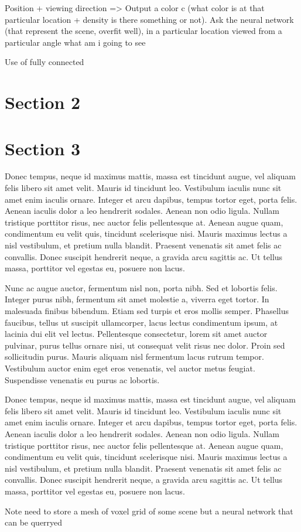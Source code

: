 \documentclass[twocolumn,superscriptaddress,aps]{revtex4-1}
\begin{document}
Position + viewing direction => Output a color c (what color is at that particular location + density is there something or not). Ask the neural network (that represent the scene, overfit well), in a particular location viewed from a particular angle what am i going to see


Use of fully connected
\section{Section 2}


\section{Section 3}

Donec tempus, neque id maximus mattis, massa est tincidunt augue, vel aliquam felis libero sit amet velit. Mauris id tincidunt leo. Vestibulum iaculis nunc sit amet enim iaculis ornare. Integer et arcu dapibus, tempus tortor eget, porta felis. Aenean iaculis dolor a leo hendrerit sodales. Aenean non odio ligula. Nullam tristique porttitor risus, nec auctor felis pellentesque at. Aenean augue quam, condimentum eu velit quis, tincidunt scelerisque nisi. Mauris maximus lectus a nisl vestibulum, et pretium nulla blandit. Praesent venenatis sit amet felis ac convallis. Donec suscipit hendrerit neque, a gravida arcu sagittis ac. Ut tellus massa, porttitor vel egestas eu, posuere non lacus.

Nunc ac augue auctor, fermentum nisl non, porta nibh. Sed et lobortis felis. Integer purus nibh, fermentum sit amet molestie a, viverra eget tortor. In malesuada finibus bibendum. Etiam sed turpis et eros mollis semper. Phasellus faucibus, tellus ut suscipit ullamcorper, lacus lectus condimentum ipsum, at lacinia dui elit vel lectus. Pellentesque consectetur, lorem sit amet auctor pulvinar, purus tellus ornare nisi, ut consequat velit risus nec dolor. Proin sed sollicitudin purus. Mauris aliquam nisl fermentum lacus rutrum tempor. Vestibulum auctor enim eget eros venenatis, vel auctor metus feugiat. Suspendisse venenatis eu purus ac lobortis.

Donec tempus, neque id maximus mattis, massa est tincidunt augue, vel aliquam felis libero sit amet velit. Mauris id tincidunt leo. Vestibulum iaculis nunc sit amet enim iaculis ornare. Integer et arcu dapibus, tempus tortor eget, porta felis. Aenean iaculis dolor a leo hendrerit sodales. Aenean non odio ligula. Nullam tristique porttitor risus, nec auctor felis pellentesque at. Aenean augue quam, condimentum eu velit quis, tincidunt scelerisque nisi. Mauris maximus lectus a nisl vestibulum, et pretium nulla blandit. Praesent venenatis sit amet felis ac convallis. Donec suscipit hendrerit neque, a gravida arcu sagittis ac. Ut tellus massa, porttitor vel egestas eu, posuere non lacus.


Note need to store a mesh of voxel grid of some scene but a neural network that can be querryed


\end{document}
